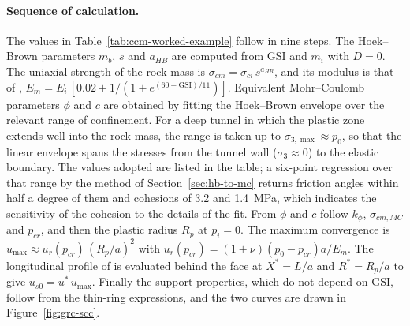 \paragraph{Sequence of calculation.}
The values in Table~\ref{tab:ccm-worked-example} follow in nine steps. The
Hoek--Brown parameters $m_b$, $s$ and $a_{HB}$ are computed from GSI and
$m_i$ with $D=0$. The uniaxial strength of the rock mass is
$\sigma_{cm} = \sigma_{ci}\, s^{a_{HB}}$, and its modulus is that of
\citet{hoekdiederichs2006},
$E_m = E_i \,[0.02 + 1/(1 + e^{(60-\mathrm{GSI})/11})]$. Equivalent
Mohr--Coulomb parameters $\phi$ and $c$ are obtained by fitting the
Hoek--Brown envelope over the relevant range of confinement. For a deep
tunnel in which the plastic zone extends well into the rock mass, the range
is taken up to $\sigma_{3,\max} \approx p_0$, so that the linear envelope
spans the stresses from the tunnel wall ($\sigma_3 \approx 0$) to the elastic
boundary. The values adopted are listed in the table; a six-point regression
over that range by the method of Section~\ref{sec:hb-to-mc} returns friction
angles within half a degree of them and cohesions of 3.2 and 1.4~MPa, which
indicates the sensitivity of the cohesion to the details of the fit. From
$\phi$ and $c$ follow $k_\phi$, $\sigma_{cm,MC}$ and $p_{cr}$, and then the
plastic radius $R_p$ at $p_i = 0$. The maximum convergence is
$u_{\max} \approx u_r(p_{cr})\,(R_p/a)^2$ with
$u_r(p_{cr}) = (1+\nu)(p_0-p_{cr})a/E_m$. The longitudinal profile of
\citet{vlachopoulos2009ldp} is evaluated behind the face at $X^* = L/a$ and
$R^* = R_p/a$ to give $u_{s0} = u^*\, u_{\max}$. Finally the support
properties, which do not depend on GSI, follow from the thin-ring
expressions, and the two curves are drawn in Figure~\ref{fig:grc-scc}.

